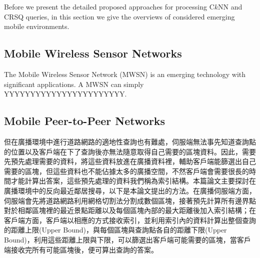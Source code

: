 Before we present the detailed proposed approaches for processing C$k$NN and CRSQ queries, in this section we give the overviews of considered emerging mobile environments.

\subsection{Mobile Wireless Sensor Networks}
The Mobile Wireless Sensor Network (MWSN) is an emerging technology with significant applications. A MWSN can simply YYYYYYYYYYYYYYYYYYYYYYY.

\subsection{Mobile Peer-to-Peer Networks}
但在廣播環境中進行道路網路的適地性查詢也有難處，伺服端無法事先知道查詢點的位置以及客戶端在下了查詢後亦無法隨意取得自己需要的區塊資料。因此，需要先預先處理需要的資料，將這些資料放進在廣播資料裡，輔助客戶端能篩選出自己需要的區塊，但這些資料也不能佔據太多的廣播空間，不然客戶端會需要很長的時間才能計算出答案，這些預先處理的資料我們稱為索引結構。本篇論文主要探討在廣播環境中的反向最近鄰居搜尋，以下是本論文提出的方法。在廣播伺服端方面，伺服端會先將道路網路利用網格切割法分割成數個區塊，接著預先計算所有邊界點對於相鄰區塊裡的最近景點距離以及每個區塊內部的最大距離後加入索引結構；在客戶端方面，客戶端以相應的方式接收索引，並利用索引內的資料計算出整個查詢的距離上限(Upper Bound)，與每個區塊與查詢點各自的距離下限(Upper Bound)，利用這些距離上限與下限，可以篩選出客戶端可能需要的區塊，當客戶端接收完所有可能區塊後，便可算出查詢的答案。